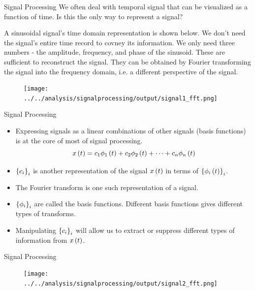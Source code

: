 \documentclass[aspectratio=169]{beamer}
\let\olditem\item
\renewcommand{\item}{\setlength{\itemsep}{\fill}\olditem}
\def\lp{\ensuremath\left(}
\def\rp{\ensuremath\right)}
\def\lc{\ensuremath\left\{}
\def\rc{\ensuremath\right\}}
\newcommand{\ct}[1]{\lp #1\rp}
\begin{document}
\begin{frame}{Signal Processing}
  We often deal with temporal signal that can be visualized as a function of time. Is this the only way to represent a signal?
  \vspace{0.2cm}

  A sinusoidal signal's time domain representation is shown below. We don't need the signal's entire time record to covney its information. We only need three numbers - the amplitude, frequency, and phase of the sinusoid. These are sufficient to reconstruct the signal. They can be obtained by Fourier transforming the signal into the frequency domain, i.e. a different perspective of the signal.
  \begin{figure}
    \centering
    \texttt{[image: ../../analysis/signalprocessing/output/signal1\_fft.png]}
  \end{figure}
\end{frame}


\begin{frame}{Signal Processing}
  \begin{itemize}
    \item Expressing signals as a linear combinations of other signals (basis functions) is at the core of most of signal processing.
    \[ x\ct{t} = c_1 \phi_1\ct{t} + c_2 \phi_2\ct{t} + \cdots + c_n \phi_n\ct{t} \]

    \item $\lc c_i \rc_{i}$ is another representation of the signal $x\ct{t}$ in terms of $\lc \phi_i\ct{t} \rc_i$.
    
    \item The Fourier transform is one such representation of a signal.
    
    \item $\lc \phi_i \rc_{i}$ are called the basis functions. Different basis functions gives different types of transforms.
    
    \item Manipulating $\lc c_i \rc_i$ will allow us to extract or suppress different types of information from $x\ct{t}$.
  \end{itemize}
\end{frame}


\begin{frame}{Signal Processing}
  \begin{figure}
    \centering
    \texttt{[image: ../../analysis/signalprocessing/output/signal2\_fft.png]}
  \end{figure}
\end{frame}
\end{document}
